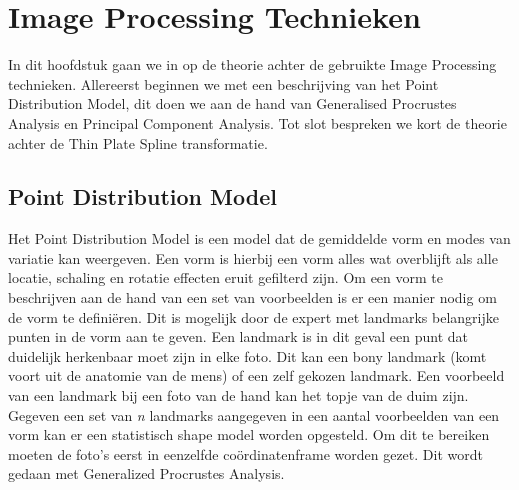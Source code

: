\section{Image Processing Technieken}
\label{Image Processing Technieken}
In dit hoofdstuk gaan we in op de theorie achter de gebruikte Image Processing technieken. 
Allereerst beginnen we met een beschrijving van het Point Distribution Model, dit doen we aan de hand van Generalised Procrustes Analysis en Principal Component Analysis. 
Tot slot bespreken we kort de theorie achter de Thin Plate Spline transformatie. 

\subsection{Point Distribution Model}
Het Point Distribution Model is een model dat de gemiddelde vorm en modes van variatie kan weergeven.\cite{PDM} 
Een vorm is hierbij een vorm alles wat overblijft als alle locatie, schaling en rotatie effecten eruit gefilterd zijn.\cite{gpa}
Om een vorm te beschrijven aan de hand van een set van voorbeelden is er een manier nodig om de vorm te defini\"{e}ren. 
Dit is mogelijk door de expert met landmarks belangrijke punten in de vorm aan te geven. 
Een landmark is in dit geval een punt dat duidelijk herkenbaar moet zijn in elke foto. 
Dit kan een bony landmark (komt voort uit de anatomie van de mens) of een zelf gekozen landmark. 
Een voorbeeld van een landmark bij een foto van de hand kan het topje van de duim zijn. 
Gegeven een set van \textit{n} landmarks aangegeven in een aantal voorbeelden van een vorm kan er een statistisch shape model worden opgesteld. 
Om dit te bereiken moeten de foto's eerst in eenzelfde co\"{o}rdinatenframe worden gezet. 
Dit wordt gedaan met Generalized Procrustes Analysis.

